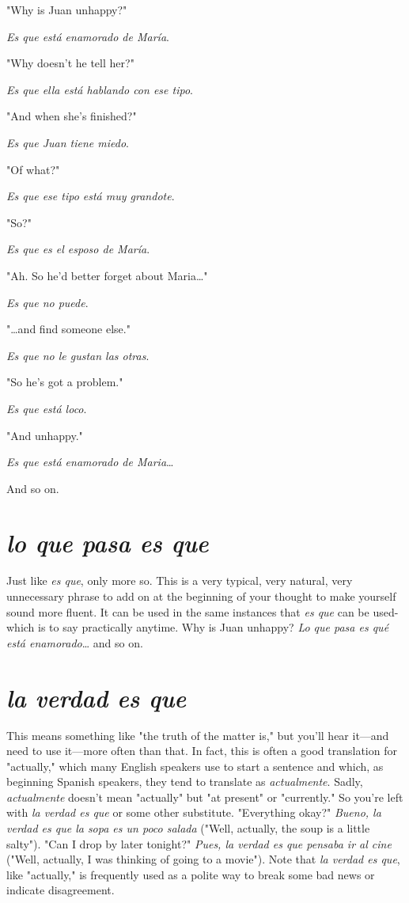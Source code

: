 \bsk

\inda "Why is Juan unhappy?"

\indu \emph{Es que está enamorado de María}.

\inda "Why doesn't he tell her?"

\indu \emph{Es que ella está hablando con ese tipo}.

\inda "And when she's finished?"

\indu \emph{Es que Juan tiene miedo}.

\inda "Of what?"

\indu \emph{Es que ese tipo está muy grandote}.

\inda "So?"

\indu \emph{Es que es el esposo de María}.

\inda "Ah. So he'd better forget about Maria\ldots{}"

\indu \emph{Es que no puede}.

\inda "\ldots{}and find someone else."

\indu \emph{Es que no le gustan las otras}.

\inda "So he's got a problem."

\indu \emph{Es que está loco}.

\inda "And unhappy."

\indu \emph{Es que está enamorado de Maria}\ldots{}

\bsk

And so on.

\section{\emph{lo que pasa es que}}

Just like \emph{es que}, only more so. This is a very typical, very
natural, very unnecessary phrase to add on at the beginning of your
thought to make yourself sound more fluent. It can be used in the
same instances that \emph{es que} can be used-which is to say practically
anytime. Why is Juan unhappy? \emph{Lo que pasa es qué está
enamorado}\ldots{} and so on.

\section{\emph{la verdad es que}}

This means something like "the truth of the matter is," but
you'll hear it---and need to use it---more often than that. In fact, this is
often a good translation for "actually," which many English speakers
use to start a sentence and which, as beginning Spanish speakers, they
tend to translate as \emph{actualmente}. Sadly, \emph{actualmente} doesn't mean
"actually" but "at present" or "currently." So you're left with \emph{la verdad es que} or some other substitute. "Everything okay?" \emph{Bueno, la
verdad es que la sopa es un poco salada} ("Well, actually, the soup is a
little salty"). "Can I drop by later tonight?" \emph{Pues, la verdad es que pensaba ir al cine} ("Well, actually, I was thinking of going to a movie").
Note that \emph{la verdad es que}, like "actually," is frequently used as a polite way to break some bad news or indicate disagreement.

